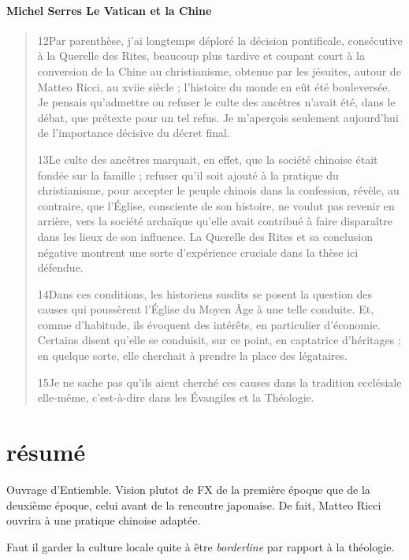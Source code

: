 \paragraph{Michel Serres Le Vatican et la Chine} 
\begin{quote}
    12Par parenthèse, j’ai longtemps déploré la décision pontificale, consécutive à la Querelle des Rites, beaucoup plus tardive et coupant court à la conversion de la Chine au christianisme, obtenue par les jésuites, autour de Matteo Ricci, au xviie siècle ; l’histoire du monde en eût été bouleversée. Je pensais qu’admettre ou refuser le culte des ancêtres n’avait été, dans le débat, que prétexte pour un tel refus. Je m’aperçois seulement aujourd’hui de l’importance décisive du décret final.

13Le culte des ancêtres marquait, en effet, que la société chinoise était fondée sur la famille ; refuser qu’il soit ajouté à la pratique du christianisme, pour accepter le peuple chinois dans la confession, révèle, au contraire, que l’Église, consciente de son histoire, ne voulut pas revenir en arrière, vers la société archaïque qu’elle avait contribué à faire disparaître dans les lieux de son influence. La Querelle des Rites et sa conclusion négative montrent une sorte d’expérience cruciale dans la thèse ici défendue.

14Dans ces conditions, les historiens susdits se posent la question des causes qui poussèrent l’Église du Moyen Âge à une telle conduite. Et, comme d’habitude, ils évoquent des intérêts, en particulier d’économie. Certains disent qu’elle se conduisit, sur ce point, en captatrice d’héritages ; en quelque sorte, elle cherchait à prendre la place des légataires.

15Je ne sache pas qu’ils aient cherché ces causes dans la tradition ecclésiale elle-même, c’est-à-dire dans les Évangiles et la Théologie.
\end{quote}


\section{résumé}

Ouvrage d'Entiemble. 
Vision plutot de FX de la première époque que de la deuxième époque, celui avant de la rencontre japonaise.
De fait, Matteo Ricci ouvrira à une pratique chinoise adaptée.

Faut il garder la culture locale quite à être \textit{borderline} par rapport à la théologie.


